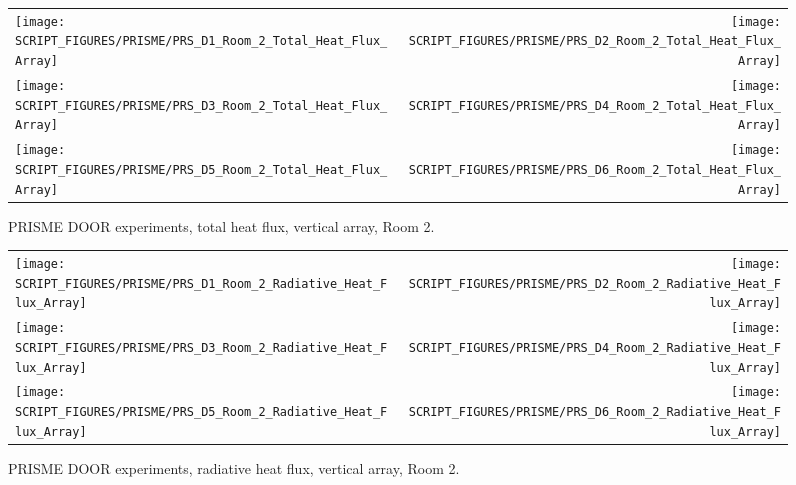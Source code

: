 \begin{figure}[p]
\begin{tabular*}{\textwidth}{l@{\extracolsep{\fill}}r}
\texttt{[image: SCRIPT\_FIGURES/PRISME/PRS\_D1\_Room\_2\_Total\_Heat\_Flux\_Array]} &
\texttt{[image: SCRIPT\_FIGURES/PRISME/PRS\_D2\_Room\_2\_Total\_Heat\_Flux\_Array]} \\
\texttt{[image: SCRIPT\_FIGURES/PRISME/PRS\_D3\_Room\_2\_Total\_Heat\_Flux\_Array]} &
\texttt{[image: SCRIPT\_FIGURES/PRISME/PRS\_D4\_Room\_2\_Total\_Heat\_Flux\_Array]} \\
\texttt{[image: SCRIPT\_FIGURES/PRISME/PRS\_D5\_Room\_2\_Total\_Heat\_Flux\_Array]} &
\texttt{[image: SCRIPT\_FIGURES/PRISME/PRS\_D6\_Room\_2\_Total\_Heat\_Flux\_Array]}
\end{tabular*}
\caption[PRISME DOOR experiments, total heat flux, vertical array, Room 2]{PRISME DOOR experiments, total heat flux, vertical array, Room 2.}
\label{PRISME_Wall_Array_THF_Room_2}
\end{figure}

\begin{figure}[p]
\begin{tabular*}{\textwidth}{l@{\extracolsep{\fill}}r}
\texttt{[image: SCRIPT\_FIGURES/PRISME/PRS\_D1\_Room\_2\_Radiative\_Heat\_Flux\_Array]} &
\texttt{[image: SCRIPT\_FIGURES/PRISME/PRS\_D2\_Room\_2\_Radiative\_Heat\_Flux\_Array]} \\
\texttt{[image: SCRIPT\_FIGURES/PRISME/PRS\_D3\_Room\_2\_Radiative\_Heat\_Flux\_Array]} &
\texttt{[image: SCRIPT\_FIGURES/PRISME/PRS\_D4\_Room\_2\_Radiative\_Heat\_Flux\_Array]} \\
\texttt{[image: SCRIPT\_FIGURES/PRISME/PRS\_D5\_Room\_2\_Radiative\_Heat\_Flux\_Array]} &
\texttt{[image: SCRIPT\_FIGURES/PRISME/PRS\_D6\_Room\_2\_Radiative\_Heat\_Flux\_Array]}
\end{tabular*}
\caption[PRISME DOOR experiments, radiative heat flux, vertical array, Room 2]{PRISME DOOR experiments, radiative heat flux, vertical array, Room 2.}
\label{PRISME_Wall_Array_RHF_Room_2}
\end{figure}

